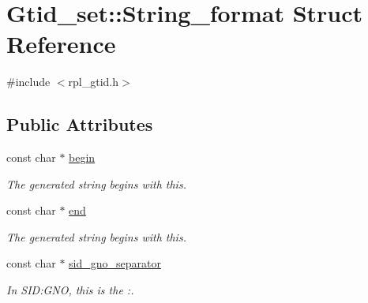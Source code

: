 \hypertarget{structGtid__set_1_1String__format}{}\section{Gtid\+\_\+set\+:\+:String\+\_\+format Struct Reference}
\label{structGtid__set_1_1String__format}


{\ttfamily \#include $<$rpl\+\_\+gtid.\+h$>$}

\subsection*{Public Attributes}
\begin{DoxyCompactItemize}
\item 
\mbox{\label{structGtid__set_1_1String__format_a87980e69804902aeaee5b8e2450703ae}} 
const char $\ast$ \mbox{\hyperlink{structGtid__set_1_1String__format_a87980e69804902aeaee5b8e2450703ae}{begin}}
\begin{DoxyCompactList}\small\item\em The generated string begins with this. \end{DoxyCompactList}\item 
\mbox{\label{structGtid__set_1_1String__format_a1cb48563a86070eabc8e42bc21f83597}} 
const char $\ast$ \mbox{\hyperlink{structGtid__set_1_1String__format_a1cb48563a86070eabc8e42bc21f83597}{end}}
\begin{DoxyCompactList}\small\item\em The generated string begins with this. \end{DoxyCompactList}\item 
\mbox{\label{structGtid__set_1_1String__format_a473afb96eb16c331e2d43debd1d8aa56}} 
const char $\ast$ \mbox{\hyperlink{structGtid__set_1_1String__format_a473afb96eb16c331e2d43debd1d8aa56}{sid\+\_\+gno\+\_\+separator}}
\begin{DoxyCompactList}\small\item\em In \textquotesingle{}S\+ID\+:G\+NO\textquotesingle{}, this is the \textquotesingle{}\+:\textquotesingle{}. \end{DoxyCompactList}\item 
\mbox{\label{structGtid__set_1_1String__format_ad2a1f82538d7a3e734510f74713ed3fd}} 

\end{DoxyCompactItemize}
